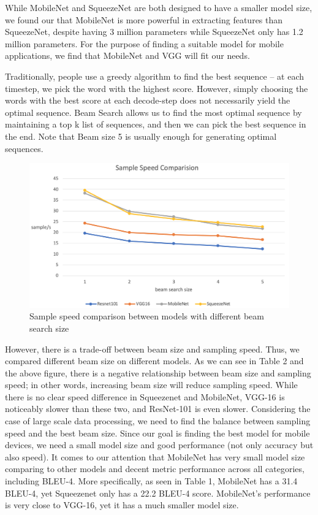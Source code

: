 \documentclass{article}
\begin{document}
While MobileNet and SqueezeNet are both designed to have a smaller model size, we found our that MobileNet is more powerful in extracting features than SqueezeNet, despite having 3 million parameters while SqueezeNet only has 1.2 million parameters. For the purpose of finding a suitable model for mobile applications, we find that MobileNet and VGG will fit our needs.

Traditionally, people use a greedy algorithm to find the best sequence – at each timestep, we pick the word with the highest score. However, simply choosing the words with the best score at each decode-step does not necessarily yield the optimal sequence. Beam Search allows us to find the most optimal sequence by maintaining a top k list of sequences, and then we can pick the best sequence in the end. Note that Beam size 5 is usually enough for generating optimal sequences.

\graphicspath{ {./images/} }
\begin{figure}[!htbp]
    \centering
    \includegraphics[scale=0.4]{graph}
    \caption{Sample speed comparison between models with different beam search size}
    \label{fig:my_label}
\end{figure}

However, there is a trade-off between beam size and sampling speed. Thus, we compared different beam size on different models. As we can see in Table 2 and the above figure, there is a negative relationship between beam size and sampling speed; in other words, increasing beam size will reduce sampling speed. While there is no clear speed difference in Squeezenet and MobileNet, VGG-16 is noticeably slower than these two, and ResNet-101 is even slower. Considering the case of large scale data processing, we need to find the balance between sampling speed and the best beam size. Since our goal is finding the best model for mobile devices, we need a small model size and good performance (not only accuracy but also speed). It comes to our attention that MobileNet has very small model size comparing to other models and decent metric performance across all categories, including BLEU-4. More specifically, as seen in Table 1, MobileNet has a 31.4 BLEU-4, yet Squeezenet only has a 22.2 BLEU-4 score. MobileNet’s performance is very close to VGG-16, yet it has a much smaller model size. 
\end{document}
